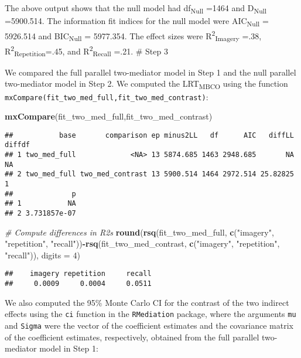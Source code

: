 \documentclass[11pt,]{article}
\newenvironment{Shaded}{\begin{snugshade}}{\end{snugshade}}
\newcommand{\CommentTok}[1]{\textcolor[rgb]{0.56,0.35,0.01}{\textit{#1}}}
\newcommand{\DataTypeTok}[1]{\textcolor[rgb]{0.13,0.29,0.53}{#1}}
\newcommand{\DecValTok}[1]{\textcolor[rgb]{0.00,0.00,0.81}{#1}}
\newcommand{\KeywordTok}[1]{\textcolor[rgb]{0.13,0.29,0.53}{\textbf{#1}}}
\newcommand{\NormalTok}[1]{#1}
\newcommand{\OperatorTok}[1]{\textcolor[rgb]{0.81,0.36,0.00}{\textbf{#1}}}
\newcommand{\StringTok}[1]{\textcolor[rgb]{0.31,0.60,0.02}{#1}}
\begin{document}
The above output shows that the null model had df\textsubscript{Null}
=1464 and D\textsubscript{Null} =5900.514. The information fit indices
for the null model were AIC\textsubscript{Null} = 5926.514 and
BIC\textsubscript{Null} = 5977.354. The effect sizes were
R\textsuperscript{2}\textsubscript{Imagery} =.38,
R\textsuperscript{2}\textsubscript{Repetition}=.45, and
R\textsuperscript{2}\textsubscript{Recall} =.21. \# Step 3

We compared the full parallel two-mediator model in Step 1 and the null
parallel two-mediator model in Step 2. We computed the
LRT\textsubscript{MBCO} using the function
\texttt{mxCompare(fit\_two\_med\_full,fit\_two\_med\_contrast)}:

\begin{Shaded}
\begin{Highlighting}[]
\KeywordTok{mxCompare}\NormalTok{(fit_two_med_full,fit_two_med_contrast) }
\end{Highlighting}
\end{Shaded}

\begin{verbatim}
##           base       comparison ep minus2LL   df      AIC   diffLL diffdf
## 1 two_med_full             <NA> 13 5874.685 1463 2948.685       NA     NA
## 2 two_med_full two_med_contrast 13 5900.514 1464 2972.514 25.82825      1
##              p
## 1           NA
## 2 3.731857e-07
\end{verbatim}

\begin{Shaded}
\begin{Highlighting}[]
\CommentTok{# Compute differences in R2s}
\KeywordTok{round}\NormalTok{(}\KeywordTok{rsq}\NormalTok{(fit_two_med_full, }\KeywordTok{c}\NormalTok{(}\StringTok{"imagery"}\NormalTok{, }\StringTok{"repetition"}\NormalTok{, }\StringTok{"recall"}\NormalTok{))}\OperatorTok{-}\KeywordTok{rsq}\NormalTok{(fit_two_med_contrast, }\KeywordTok{c}\NormalTok{(}\StringTok{"imagery"}\NormalTok{, }\StringTok{"repetition"}\NormalTok{, }\StringTok{"recall"}\NormalTok{)), }\DataTypeTok{digits =} \DecValTok{4}\NormalTok{)}
\end{Highlighting}
\end{Shaded}

\begin{verbatim}
##    imagery repetition     recall 
##     0.0009     0.0004     0.0511
\end{verbatim}

We also computed the 95\% Monte Carlo CI for the contrast of the two
indirect effects using the \texttt{ci} function in the
\texttt{RMediation} package, where the arguments \texttt{mu} and
\texttt{Sigma} were the vector of the coefficient estimates and the
covariance matrix of the coefficient estimates, respectively, obtained
from the full parallel two-mediator model in Step 1:
\end{document}
